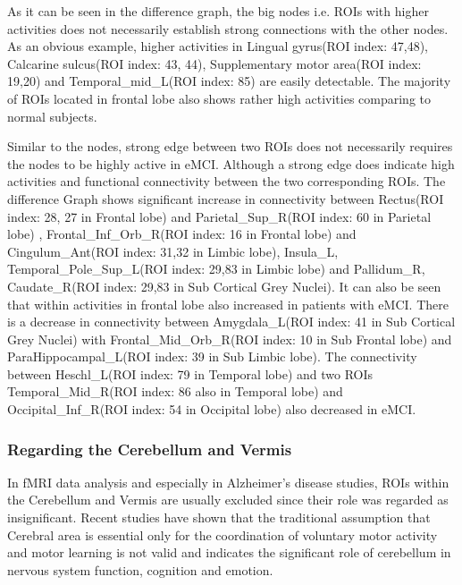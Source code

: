 \documentclass[journal]{IEEEtran}
\begin{document}
	As it can be seen in the difference graph, the big nodes i.e. ROIs with higher activities does not necessarily establish strong connections with the other nodes. As an obvious example, higher activities in Lingual gyrus(ROI index: 47,48)\cite{r24,r25}, Calcarine sulcus(ROI index: 43, 44)\cite{r26,r27}, Supplementary motor area(ROI index: 19,20)\cite{r27,r28} and Temporal\_mid\_L(ROI index: 85)\cite{r29} are easily detectable. The majority of ROIs located in frontal lobe also shows rather high activities comparing to normal subjects\cite{r30,r31}.
	
	Similar to the nodes, strong edge between two ROIs does not necessarily requires the nodes to be highly active in eMCI. Although a strong edge does indicate high activities and functional connectivity between the two corresponding ROIs. The difference Graph shows significant increase in connectivity between 
	Rectus(ROI index: 28, 27 in Frontal lobe) and 
	Parietal\_Sup\_R(ROI index: 60 in Parietal lobe) \cite{r40, r41},
	Frontal\_Inf\_Orb\_R(ROI index: 16 in Frontal lobe) and
	Cingulum\_Ant(ROI index: 31,32 in Limbic lobe)\cite{r42},
	Insula\_L, Temporal\_Pole\_Sup\_L(ROI index: 29,83 in Limbic lobe) and
	Pallidum\_R, Caudate\_R(ROI index: 29,83 in Sub Cortical Grey Nuclei)\cite{r43}. It can also be seen that within activities in frontal lobe also increased in patients with eMCI\cite{r44}. There is a decrease in connectivity between Amygdala\_L(ROI index: 41 in Sub Cortical Grey Nuclei) with Frontal\_Mid\_Orb\_R(ROI index: 10 in Sub Frontal lobe) and ParaHippocampal\_L(ROI index: 39 in Sub Limbic lobe)\cite{r45}. The connectivity between Heschl\_L(ROI index: 79 in Temporal lobe) and two ROIs Temporal\_Mid\_R(ROI index: 86 also in Temporal lobe) and Occipital\_Inf\_R(ROI index: 54 in Occipital lobe) also decreased in eMCI\cite{r46}.  
	
	\subsubsection*{\textbf{Regarding the Cerebellum and Vermis}}
	In fMRI data analysis and especially in Alzheimer's disease studies, ROIs within the Cerebellum and Vermis are usually excluded since their role was regarded as insignificant\cite{r47, r48}. Recent studies have shown that the traditional assumption that Cerebral area is essential only for the coordination of voluntary motor activity and motor learning is not valid and indicates the significant role of cerebellum in nervous system function, cognition and emotion\cite{r32}. 
	
\end{document}
